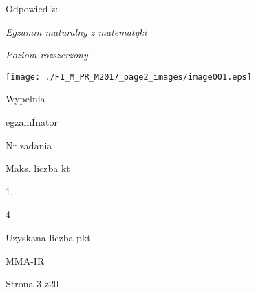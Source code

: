 \documentclass[a4paper,12pt]{article}
\begin{document}
Odpowied $\acute{\mathrm{z}}$:

{\it Egzamin maturalny z matematyki}

{\it Poziom rozszerzony}
\begin{center}
\texttt{[image: ./F1\_M\_PR\_M2017\_page2\_images/image001.eps]}
\end{center}
Wypelnia

egzamÍnator

Nr zadania

Maks. liczba kt

1.

4

Uzyskana liczba pkt

MMA-IR

Strona 3 z20
\end{document}
